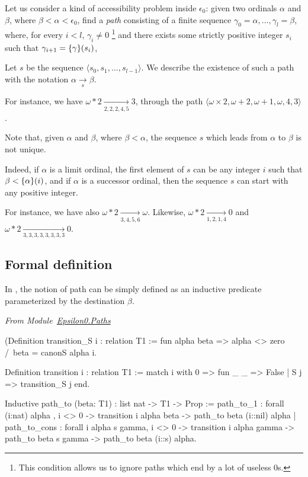 \documentclass[a4paper]{book}
\begin{document}
Let us consider a kind of accessibility problem inside $\epsilon_0$: given two ordinals $\alpha$ and $\beta$, where $\beta<\alpha<\epsilon_0$, find a \emph{path} consisting of a finite sequence $\gamma_0=\alpha,\dots,\gamma_l=\beta$,
where, for every $i<l$, $\gamma_i \not= 0$ \footnote{This condition allows us to ignore paths which end by a lot of useless $0$s.} and there exists some strictly positive integer $s_i$
such that $\gamma_{i+1}=\mbox{$\{\gamma\}(s_i)$}$,

Let $s$ be the sequence $\langle s_0,s_1,\dots, s_{l-1} \rangle$. We describe the
existence of such a path with the notation $\alpha\xrightarrow [s]{}\beta$.


For instance, we have $\omega*2 \xrightarrow[2,2,2,4,5]{}3$, through the 
path $\langle\omega\times 2, \omega+2,\omega+1,\omega,4,3\rangle$.


\begin{remark}
  

Note that, given $\alpha$ and $\beta$, where $\beta < \alpha$, the sequence $s$ which leads from $\alpha$ to $\beta$ is not unique.

Indeed, if $\alpha$ is a limit ordinal, the first element of $s$ can be any integer $i$ such that $\beta<\mbox{$\{\alpha\}(i)$}$, and if $\alpha$ is a successor ordinal,
then the sequence $s$ can start with any positive integer.


For instance, we have also 
$\omega*2 \xrightarrow[3,4,5,6]{}\omega$. 
Likewise,
$\omega*2 \xrightarrow[1,2,1,4]{} 0$ and
$\omega*2 \xrightarrow[3,3,3,3,3,3,3,3]{} 0$.
\end{remark}

\subsection{Formal definition}

\label{path-to-definition}

In \coq{}, the notion of path can be simply defined as an inductive predicate 
parameterized by the destination $\beta$.

\vspace{4pt}
\emph{From Module~\href{../src/html/hydras.Epsilon0.Paths.html}{Epsilon0.Paths}}

\label{sect:path-to-def}

\begin{Coqsrc}
(Definition transition_S i : relation T1 :=
  fun alpha beta =>  alpha <> zero /\ beta = canonS alpha i.

Definition transition i : relation T1 :=
  match i with 0 => fun _ _ => False | S j => transition_S j end.

Inductive path_to (beta: T1) : list nat -> T1 -> Prop :=
  path_to_1 : forall (i:nat) alpha , 
    i <> 0 ->
    transition i alpha beta ->
    path_to beta (i::nil) alpha
| path_to_cons : forall i alpha s gamma,
    i <> 0 ->
    transition i alpha gamma ->
    path_to beta  s gamma ->
    path_to beta  (i::s) alpha.
\end{Coqsrc}
\end{document}
